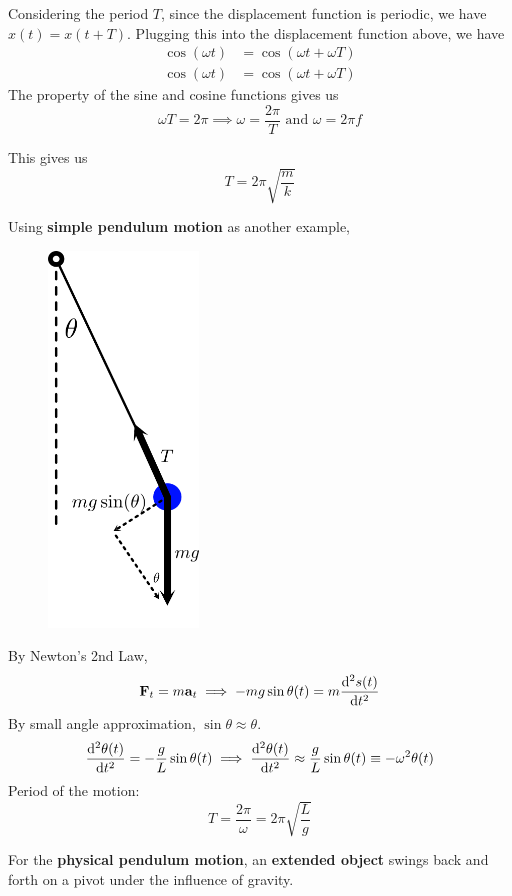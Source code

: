 Considering the period $T$, since the displacement function is periodic, we have $x(t)=x(t+T)$. Plugging this into the displacement function above, we have 
\begin{align*}
\cos(\omega t) &= \cos(\omega t+\omega T) \\
\cos(\omega t) &= \cos(\omega t+\omega T)
\end{align*}
The property of the sine and cosine functions gives us \[ \omega T=2\pi \implies \omega=\frac{2\pi}{T} \text{ and } \omega=2\pi f \]

This gives us \[ T=2\pi\sqrt{\frac{m}{k}} \]
\pagebreak

Using \textbf{simple pendulum motion} as another example, 

\begin{figure}[H]
    \centering
    \includegraphics[width=4cm]{images/pendulum-fbd.png}
\end{figure}

By Newton's 2nd Law, 
\[ \vb{F}_t=m\vb{a}_t \implies -mg\sin\theta(t)=m\dv[2]{s(t)}{t} \]
By small angle approximation, $\sin\theta \approx \theta$.
\[ \dv[2]{\theta(t)}{t} = -\frac{g}{L}\sin\theta(t) \implies \dv[2]{\theta(t)}{t} \approx \frac{g}{L}\sin\theta(t) \equiv -\omega^2\theta(t) \]
Period of the motion:
\[ T=\frac{2\pi}{\omega}=2\pi\sqrt{\frac{L}{g}} \]
\pagebreak

For the \textbf{physical pendulum motion}, an \textbf{extended object} swings back and forth on a pivot under the influence of gravity.

